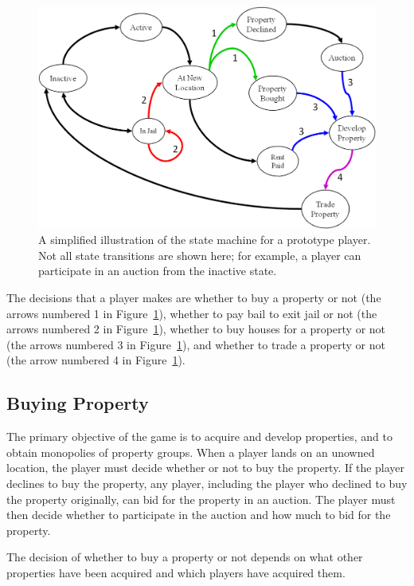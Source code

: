 \begin{figure}[htp]
\centerline{\includegraphics[width=1.0\columnwidth]{Figures/statemachine.png}}
\caption[Monopoly player state machine]{A simplified illustration of the state
machine for a prototype player. Not all state transitions are shown here; for
example, a player can participate in an auction from the inactive state.}
\label{figure-statemachine}
\end{figure}

The decisions that a player makes are whether to buy a property or not (the
arrows numbered 1 in Figure~\ref{figure-statemachine}), whether to pay bail to
exit jail or not (the arrows numbered 2 in Figure~\ref{figure-statemachine}),
whether to buy houses for a property or not (the arrows numbered 3 in
Figure~\ref{figure-statemachine}), and whether to trade a property or not (the
arrow numbered 4 in Figure~\ref{figure-statemachine}).

\subsection{Buying Property}
The primary objective of the game is to acquire and develop properties, and to
obtain monopolies of property groups. When a player lands on an unowned
location, the player must decide whether or not to buy the property. If the
player declines to buy the property, any player, including the player who
declined to buy the property originally, can bid for the property in an auction.
The player must then decide whether to participate in the auction and how much
to bid for the property.

The decision of whether to buy a property or not depends on what other
properties have been acquired and which players have acquired them.
  
